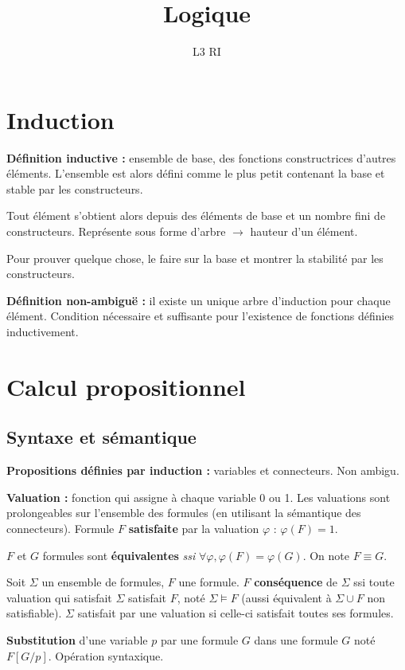 \documentclass[french]{article}
\title{Logique}
\date{}
\author{L3 RI}
\begin{document}
\maketitle
\tableofcontents
\section{Induction}

\textbf{Définition inductive :} ensemble de base, des fonctions constructrices d'autres éléments. L'ensemble est alors défini comme le plus petit contenant la base et stable par les constructeurs.

Tout élément s'obtient alors depuis des éléments de base et un nombre fini de constructeurs. Représente sous forme d'arbre $\rightarrow$ hauteur d'un élément.

Pour prouver quelque chose, le faire sur la base et montrer la stabilité par les constructeurs.

\textbf{Définition non-ambiguë :} il existe un unique arbre d'induction pour chaque élément. Condition nécessaire et suffisante pour l'existence de fonctions définies inductivement.

\section{Calcul propositionnel}
\subsection{Syntaxe et sémantique}
\textbf{Propositions définies par induction :} variables et connecteurs. Non ambigu.

\textbf{Valuation : }fonction qui assigne à chaque variable 0 ou 1.
Les valuations sont prolongeables sur l'ensemble des formules (en utilisant la sémantique des connecteurs). Formule $F$ \textbf{satisfaite} par la valuation $\varphi$ : $\varphi (F) = 1$.

$F$ et $G$ formules sont \textbf{équivalentes} \emph{ssi} $\forall\varphi ,\varphi (F) = \varphi (G)$. On note $F\equiv G$. 

Soit $\Sigma$ un ensemble de formules, $F$ une formule. $F$ \textbf{conséquence} de $\Sigma$ ssi toute valuation qui satisfait $\Sigma$ satisfait $F$, noté $\Sigma\models F$ (aussi équivalent à $\Sigma\cup F$ non satisfiable). $\Sigma$ satisfait par une valuation si celle-ci satisfait toutes ses formules.

\textbf{Substitution} d'une variable $p$ par une formule $G$ dans une formule $G$ noté $F[G/p]$. Opération syntaxique.
\end{document}
